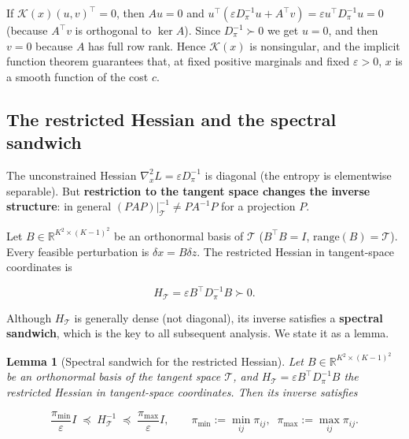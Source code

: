 \documentclass[11pt,a4paper]{article}
\newtheorem{lemma}[theorem]{Lemma}
\theoremstyle{remark}
\begin{document}
If $\mathcal{K}(x)(u,v)^{\top}=0$, then $Au=0$ and
$u^{\top}(\varepsilon D_\pi^{-1}u+A^{\top}v)=\varepsilon u^{\top}D_\pi^{-1}u=0$ (because
$A^{\top}v$ is orthogonal to $\ker A$). Since $D_\pi^{-1}\succ0$ we get $u=0$, and then
$v=0$ because $A$ has full row rank. Hence $\mathcal{K}(x)$ is nonsingular, and the
implicit function theorem guarantees that, at fixed positive marginals and fixed
$\varepsilon>0$, $x$ is a smooth function of the cost $c$.

\subsection{The restricted Hessian and the spectral sandwich}

The unconstrained Hessian $\nabla_x^2 L=\varepsilon D_\pi^{-1}$ is diagonal (the entropy is
elementwise separable). But \textbf{restriction to the tangent space changes the inverse
structure}: in general $(PAP)|_{\mathcal{T}}^{-1}\neq PA^{-1}P$ for a projection $P$.

Let $B\in\mathbb{R}^{K^2\times(K-1)^2}$ be an orthonormal basis of $\mathcal{T}$
($B^{\top}B=I$, $\mathrm{range}(B)=\mathcal{T}$). Every feasible perturbation is
$\delta x=B\delta z$. The restricted Hessian in tangent-space coordinates is

\begin{equation}
H_{\mathcal{T}}=\varepsilon B^{\top}D_\pi^{-1}B\succ 0. \label{eq:33}
\end{equation}

Although $H_{\mathcal{T}}$ is generally dense (not diagonal), its inverse satisfies a
\textbf{spectral sandwich}, which is the key to all subsequent analysis. We state it as a
lemma.

\begin{lemma}[Spectral sandwich for the restricted Hessian]\label{lem:sandwich}
Let $B\in\mathbb{R}^{K^2\times(K-1)^2}$ be an orthonormal basis of the tangent space
$\mathcal{T}$, and $H_{\mathcal{T}}=\varepsilon B^{\top}D_\pi^{-1}B$ the restricted Hessian
in tangent-space coordinates. Then its inverse satisfies

\begin{equation}
\boxed{\frac{\pi_{\min}}{\varepsilon}I\;\preceq\;H_{\mathcal{T}}^{-1}\;\preceq\;\frac{\pi_{\max}}{\varepsilon}I},\qquad
\pi_{\min}:=\min_{ij}\pi_{ij},\;\;
\pi_{\max}:=\max_{ij}\pi_{ij}. \label{eq:sl_sandwich}
\end{equation}
\end{lemma}
\end{document}
